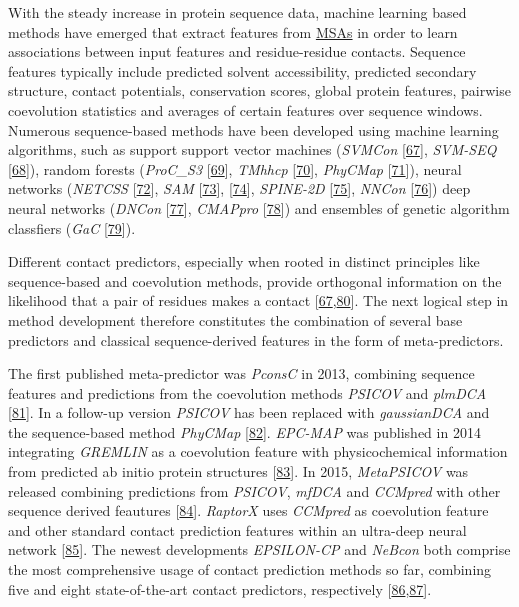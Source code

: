 \documentclass[11pt,a4paper,twoside]{book}
\theoremstyle{definition}
\theoremstyle{definition}
\theoremstyle{remark}
\begin{document}
With the steady increase in protein sequence data, machine learning
based methods have emerged that extract features from
\protect\hyperlink{abbrev}{MSAs} in order to learn associations between
input features and residue-residue contacts. Sequence features typically
include predicted solvent accessibility, predicted secondary structure,
contact potentials, conservation scores, global protein features,
pairwise coevolution statistics and averages of certain features over
sequence windows. Numerous sequence-based methods have been developed
using machine learning algorithms, such as support support vector
machines (\emph{SVMCon} {[}\protect\hyperlink{ref-Cheng2007}{67}{]},
\emph{SVM-SEQ} {[}\protect\hyperlink{ref-Wu2008}{68}{]}), random forests
(\emph{ProC\_S3} {[}\protect\hyperlink{ref-Li2011}{69}{]}, \emph{TMhhcp}
{[}\protect\hyperlink{ref-Wang2011}{70}{]}, \emph{PhyCMap}
{[}\protect\hyperlink{ref-Wang2013}{71}{]}), neural networks
(\emph{NETCSS} {[}\protect\hyperlink{ref-Fariselli2001a}{72}{]},
\emph{SAM} {[}\protect\hyperlink{ref-Shackelford2007}{73}{]},
{[}\protect\hyperlink{ref-Hamilton2004a}{74}{]}, \emph{SPINE-2D}
{[}\protect\hyperlink{ref-Xue2009a}{75}{]}, \emph{NNCon}
{[}\protect\hyperlink{ref-Tegge2009a}{76}{]}) deep neural networks
(\emph{DNCon} {[}\protect\hyperlink{ref-Eickholt2012}{77}{]},
\emph{CMAPpro} {[}\protect\hyperlink{ref-DiLena2012a}{78}{]}) and
ensembles of genetic algorithm classfiers (\emph{GaC}
{[}\protect\hyperlink{ref-Chen2010}{79}{]}).

Different contact predictors, especially when rooted in distinct
principles like sequence-based and coevolution methods, provide
orthogonal information on the likelihood that a pair of residues makes a
contact
{[}\protect\hyperlink{ref-Cheng2007}{67},\protect\hyperlink{ref-Jones2015}{80}{]}.
The next logical step in method development therefore constitutes the
combination of several base predictors and classical sequence-derived
features in the form of meta-predictors.

The first published meta-predictor was \emph{PconsC} in 2013, combining
sequence features and predictions from the coevolution methods
\emph{PSICOV} and \emph{plmDCA}
{[}\protect\hyperlink{ref-Skwark2013}{81}{]}. In a follow-up version
\emph{PSICOV} has been replaced with \emph{gaussianDCA} and the
sequence-based method \emph{PhyCMap}
{[}\protect\hyperlink{ref-Skwark2016}{82}{]}. \emph{EPC-MAP} was
published in 2014 integrating \emph{GREMLIN} as a coevolution feature
with physicochemical information from predicted ab initio protein
structures {[}\protect\hyperlink{ref-Schneider2014}{83}{]}. In 2015,
\emph{MetaPSICOV} was released combining predictions from \emph{PSICOV},
\emph{mfDCA} and \emph{CCMpred} with other sequence derived feautures
{[}\protect\hyperlink{ref-Jones2015a}{84}{]}. \emph{RaptorX} uses
\emph{CCMpred} as coevolution feature and other standard contact
prediction features within an ultra-deep neural network
{[}\protect\hyperlink{ref-Wang2016a}{85}{]}. The newest developments
\emph{EPSILON-CP} and \emph{NeBcon} both comprise the most comprehensive
usage of contact prediction methods so far, combining five and eight
state-of-the-art contact predictors, respectively
{[}\protect\hyperlink{ref-Stahl2017}{86},\protect\hyperlink{ref-He2017}{87}{]}.
\end{document}
